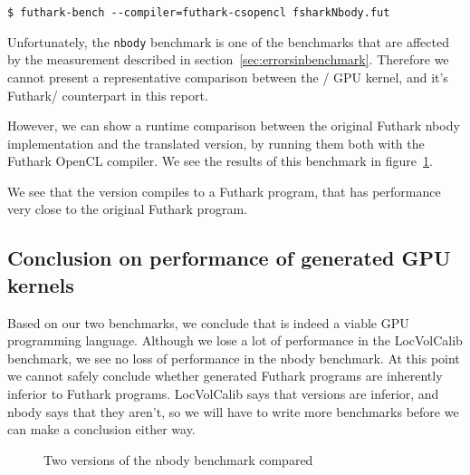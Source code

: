 \begin{verbatim}
$ futhark-bench --compiler=futhark-csopencl fsharkNbody.fut
\end{verbatim}

Unfortunately, the \texttt{nbody} benchmark is one of the benchmarks that are
affected by the measurement described in section~\ref{sec:errorsinbenchmark}.
Therefore we cannot present a representative comparison between the
\fshark{}/\csharp{} GPU kernel, and it's Futhark/\clang{} counterpart in this report.

However, we can show a runtime comparison between the original Futhark nbody
implementation and the translated \fshark{} version, by running them both with
the Futhark \clang{} OpenCL compiler. We see the results of this benchmark in
figure~\ref{fig:nbodygraphh}.

We see that the \fshark{} version compiles to a Futhark program, that has
performance very close to the original Futhark program.

\subsection{Conclusion on performance of \fshark{} generated GPU kernels}
\label{sec:fsharkgpubenchmarks}
Based on our two benchmarks, we conclude that \fshark{} is indeed a viable GPU
programming language. Although we lose a lot of performance in the LocVolCalib
benchmark, we see no loss of performance in the nbody benchmark.
At this point we cannot safely conclude whether \fshark{} generated Futhark
programs are inherently inferior to Futhark programs.
LocVolCalib says that \fshark{} versions are inferior, and nbody says that they
aren't, so we will have to write more benchmarks before we can make a conclusion
either way.

\begin{figure}
    \caption{Two versions of the nbody benchmark compared}
    \label{fig:nbodygraphh}
\end{figure}

